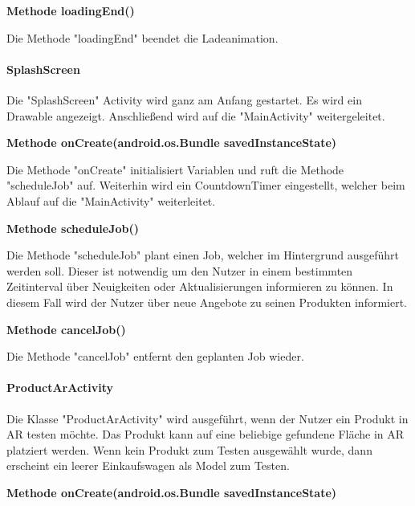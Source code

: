 \documentclass{scrartcl}
\begin{document}
\noindent\textbf{Methode loadingEnd()}

\noindent Die Methode "loadingEnd" beendet die Ladeanimation. \newline

\newpage

\paragraph{SplashScreen}

Die "SplashScreen" Activity wird ganz am Anfang gestartet. Es wird ein Drawable angezeigt. Anschließend wird auf die "MainActivity" weitergeleitet. \newline

\noindent\textbf{Methode onCreate(android.os.Bundle savedInstanceState)}

\noindent Die Methode "onCreate" initialisiert Variablen und ruft die Methode "scheduleJob" auf. Weiterhin wird ein CountdownTimer eingestellt, welcher beim Ablauf auf die "MainActivity" weiterleitet. \newline

\noindent\textbf{Methode scheduleJob()}

\noindent Die Methode "scheduleJob" plant einen Job, welcher im Hintergrund ausgeführt werden soll. Dieser ist notwendig um den Nutzer in einem bestimmten Zeitinterval über Neuigkeiten oder Aktualisierungen informieren zu können. In diesem Fall wird der Nutzer über neue Angebote zu seinen Produkten informiert. \newline

\noindent\textbf{Methode cancelJob()}

\noindent Die Methode "cancelJob" entfernt den geplanten Job wieder. \newline

\newpage

\paragraph{ProductArActivity} Die Klasse "ProductArActivity" wird ausgeführt, wenn der Nutzer ein Produkt in AR testen möchte. Das Produkt kann auf eine beliebige gefundene Fläche in AR platziert werden. Wenn kein Produkt zum Testen ausgewählt wurde, dann erscheint ein leerer Einkaufswagen als Model zum Testen. \newline

\noindent\textbf{Methode onCreate(android.os.Bundle savedInstanceState)} 
\end{document}

